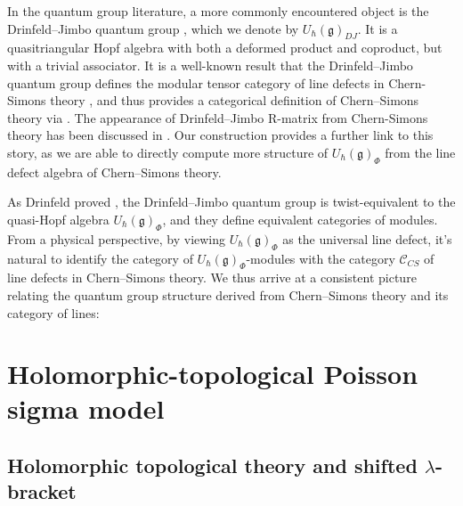 \documentclass[11pt]{article}
\numberwithin{equation}{section}
\begin{document}
In the quantum group literature, a more commonly encountered object is the Drinfeld--Jimbo quantum group \cite{Drinfeld1987QG}, which we denote by $U_\hbar(\mathfrak{g})_{DJ}$. It is a quasitriangular Hopf algebra with both a deformed product and coproduct, but with a trivial associator. It is a well-known result that the Drinfeld--Jimbo quantum group defines the modular tensor category of line defects in Chern-Simons theory \cite{reshetikhin1991invariants}, and thus provides a categorical definition of Chern--Simons theory via \cite{witten1989quantum,turaev2016quantum}. The appearance of Drinfeld--Jimbo R-matrix from Chern-Simons theory has been discussed in \cite{Aamand:2019evs}. Our construction provides a further link to this story, as we are able to directly compute more structure of $U_{\hbar}(\mathfrak{g})_{\Phi}$ from the line defect algebra of Chern--Simons theory. 

As Drinfeld proved \cite{Drinfeld1990QuasiHopf}, the Drinfeld--Jimbo quantum group is twist-equivalent to the quasi-Hopf algebra $U_{\hbar}(\mathfrak{g})_{\Phi}$, and they define equivalent categories of modules. From a physical perspective, by viewing $U_{\hbar}(\mathfrak{g})_{\Phi}$ as the universal line defect, it's natural to identify the category of $U_{\hbar}(\mathfrak{g})_{\Phi}$-modules with the category $\mathcal{C}_{CS}$ of line defects in Chern--Simons theory. We thus arrive at a consistent picture relating the quantum group structure derived from Chern--Simons theory and its category of lines:

\begin{center}
\end{center}



\section{Holomorphic-topological Poisson sigma model}
\label{sec:HT_PSM}
\subsection{Holomorphic topological theory and shifted $\lambda$-bracket} 
\end{document}

